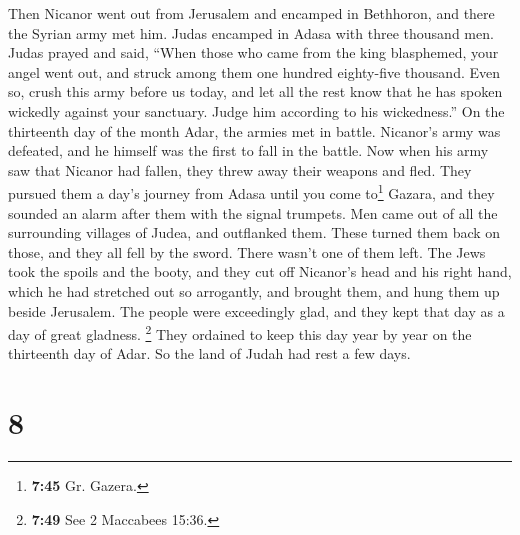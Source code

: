  Then Nicanor went out from Jerusalem and encamped in
Bethhoron, and there the Syrian army met him.  Judas
encamped in Adasa with three thousand men. Judas prayed and said,
 ``When those who came from the king blasphemed, your
angel went out, and struck among them one hundred eighty-five thousand.
 Even so, crush this army before us today, and let all
the rest know that he has spoken wickedly against your sanctuary. Judge
him according to his wickedness.''  On the thirteenth day
of the month Adar, the armies met in battle. Nicanor's army was
defeated, and he himself was the first to fall in the battle.
 Now when his army saw that Nicanor had fallen, they
threw away their weapons and fled.  They pursued them a
day's journey from Adasa until you come to\footnote{\textbf{7:45} Gr.
  Gazera.} Gazara, and they sounded an alarm after them with the signal
trumpets.  Men came out of all the surrounding villages
of Judea, and outflanked them. These turned them back on those, and they
all fell by the sword. There wasn't one of them left. 
The Jews took the spoils and the booty, and they cut off Nicanor's head
and his right hand, which he had stretched out so arrogantly, and
brought them, and hung them up beside Jerusalem.  The
people were exceedingly glad, and they kept that day as a day of great
gladness.  \footnote{\textbf{7:49} See 2 Maccabees 15:36.}
They ordained to keep this day year by year on the thirteenth day of
Adar.  So the land of Judah had rest a few days.

\hypertarget{section-7}{%
\section{8}\label{section-7}}

